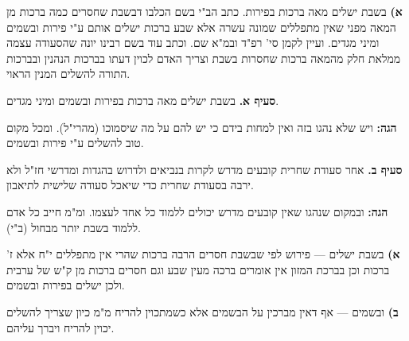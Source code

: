 \documentclass[11pt,letterpaper,openany]{scrbook}
\newcommand{\zonelabel}[1]{%
  \par\noindent{\commentaryfont\fontsize{8}{10}\selectfont\textcolor{hcolor}{\textbf{#1}}}\par\smallskip
}
\begin{document}
\begin{sloppypar}
\begin{minipage}[t]{0.80\textwidth}
\noindent
%
\begin{minipage}[t]{0.265\textwidth}
\begin{magenbox}
\begin{hebrew}
\commentaryfont\fontsize{9}{11.5}\selectfont
\zonelabel{מגן אברהם}
\textbf{א)} בשבת ישלים מאה ברכות בפירות.
כתב הב"י בשם הכלבו דבשבת שחסרים
כמה ברכות מן המאה מפני שאין מתפללים
שמונה עשרה אלא שבע ברכות ישלים
אותם ע"י פירות ובשמים ומיני מגדים.
ועיין לקמן סי' רפ"ד ובמ"א שם.
וכתב עוד בשם רבינו יונה
שהסעודה עצמה ממלאת חלק
מהמאה ברכות שחסרות בשבת
וצריך האדם לכוין דעתו
בברכות הנהנין ובברכות התורה
להשלים המנין הראוי.
\end{hebrew}
\end{magenbox}
\end{minipage}%
\hfill
%
\begin{minipage}[t]{0.41\textwidth}
\begin{mechaberbox}
\begin{hebrew}
\mechaberfont\fontsize{12}{15}\selectfont
\zonelabel{שולחן ערוך}
\textbf{סעיף א.}
בשבת ישלים מאה ברכות בפירות
ובשמים ומיני מגדים.

\medskip
\textcolor{remaGreen}{\textbf{הגה:}}
\textcolor{remaGreen}{ויש שלא נהגו בזה ואין
למחות בידם כי יש להם על מה שיסמוכו
(מהרי"ל). ומכל מקום טוב להשלים
ע"י פירות ובשמים.}

\bigskip
\textbf{סעיף ב.}
אחר סעודת שחרית קובעים מדרש
לקרות בנביאים ולדרוש בהגדות
ומדרשי חז"ל ולא ירבה בסעודת
שחרית כדי שיאכל סעודה שלישית
לתיאבון.

\medskip
\textcolor{remaGreen}{\textbf{הגה:}}
\textcolor{remaGreen}{ובמקום שנהגו שאין קובעים מדרש
יכולים ללמוד כל אחד לעצמו.
ומ"מ חייב כל אדם ללמוד
בשבת יותר מבחול (ב"י).}
\end{hebrew}
\end{mechaberbox}
\end{minipage}%
\hfill
%
\begin{minipage}[t]{0.265\textwidth}
\begin{mbbox}
\begin{hebrew}
\commentaryfont\fontsize{9}{11.5}\selectfont
\zonelabel{משנה ברורה}
\textbf{א)} בשבת ישלים — פירוש
לפי שבשבת חסרים הרבה ברכות
שהרי אין מתפללים י"ח אלא ז' ברכות
וכן בברכת המזון אין אומרים ברכה מעין שבע
וגם חסרים ברכות מן ק"ש של ערבית
ולכן ישלים בפירות ובשמים.

\medskip
\textbf{ב)} ובשמים — אף דאין מברכין
על הבשמים אלא כשמתכוין להריח
מ"מ כיון שצריך להשלים יכוין להריח
ויברך עליהם.


\end{hebrew}
\end{mbbox}
\end{minipage}
\end{minipage}
\end{sloppypar}
\end{document}
